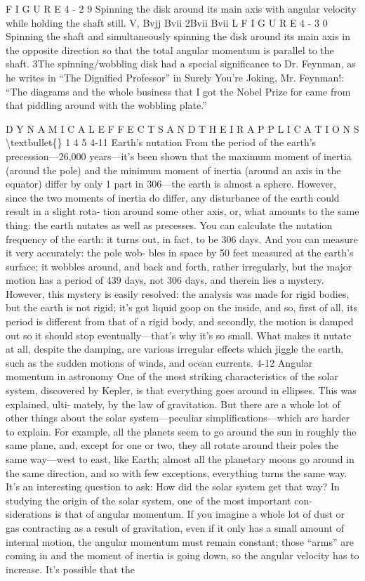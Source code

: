 \documentclass[10pt,oneside]{article}
\begin{document}
F I G U R E  4 - 2 9 Spinning the disk around its main axis with angular velocity while holding the shaft still. V, Bvjj Bvii 2Bvii Bvii L F I G U R E  4 - 3 0 Spinning the shaft and simultaneously spinning the disk around its main axis in the opposite direction so that the total angular momentum is parallel to the shaft. 3The spinning/wobbling disk had a special significance to Dr. Feynman, as he writes in “The Dignified Professor” in Surely You’re Joking, Mr. Feynman!: “The diagrams and the whole business that I got the Nobel Prize for came from that piddling around with the wobbling plate.”\par

D Y N A M I C A L  E F F E C T S  A N D  T H E I R  A P P L I C A T I O N S \textbackslash{}textbullet\{\} 1 4 5 4-11 Earth’s nutation From the period of the earth’s precession---26,000 years---it’s been shown that the maximum moment of inertia (around the pole) and the minimum moment of inertia (around an axis in the equator) differ by only 1 part in 306---the earth is almost a sphere. However, since the two moments of inertia do differ, any disturbance of the earth could result in a slight rota- tion around some other axis, or, what amounts to the same thing: the earth nutates as well as precesses. You can calculate the nutation frequency of the earth: it turns out, in fact, to be 306 days. And you can measure it very accurately: the pole wob- bles in space by 50 feet measured at the earth’s surface; it wobbles around, and back and forth, rather irregularly, but the major motion has a period of 439 days, not 306 days, and therein lies a mystery. However, this mystery is easily resolved: the analysis was made for rigid bodies, but the earth is not rigid; it’s got liquid goop on the inside, and so, first of all, its period is different from that of a rigid body, and secondly, the motion is damped out so it should stop eventually---that’s why it’s so small. What makes it nutate at all, despite the damping, are various irregular effects which jiggle the earth, such as the sudden motions of winds, and ocean currents. 4-12 Angular momentum in astronomy One of the most striking characteristics of the solar system, discovered by Kepler, is that everything goes around in ellipses. This was explained, ulti- mately, by the law of gravitation. But there are a whole lot of other things about the solar system---peculiar simplifications---which are harder to explain. For example, all the planets seem to go around the sun in roughly the same plane, and, except for one or two, they all rotate around their poles the same way---west to east, like Earth; almost all the planetary moons go around in the same direction, and so with few exceptions, everything turns the same way. It’s an interesting question to ask: How did the solar system get that way? In studying the origin of the solar system, one of the most important con- siderations is that of angular momentum. If you imagine a whole lot of dust or gas contracting as a result of gravitation, even if it only has a small amount of internal motion, the angular momentum must remain constant; those “arms” are coming in and the moment of inertia is going down, so the angular velocity has to increase. It’s possible that the 
\end{document}
